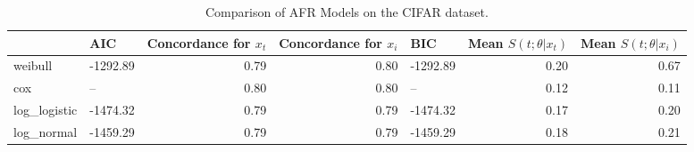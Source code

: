 \begin{table}
\caption{Comparison of AFR Models on the CIFAR dataset.}
\label{tab:cifar}
\begin{tabular}{llrrlrr}
\toprule
 & AIC & Concordance for $x_t$ & Concordance for $x_i$ & BIC & Mean $S(t;\theta|x_{t})$ & Mean $S(t;\theta|x_{i})$ \\
\midrule
weibull & -1292.89 & 0.79 & 0.80 & -1292.89 & 0.20 & 0.67 \\
cox & -- & 0.80 & 0.80 & -- & 0.12 & 0.11 \\
log_logistic & -1474.32 & 0.79 & 0.79 & -1474.32 & 0.17 & 0.20 \\
log_normal & -1459.29 & 0.79 & 0.79 & -1459.29 & 0.18 & 0.21 \\
\bottomrule
\end{tabular}
\end{table}
